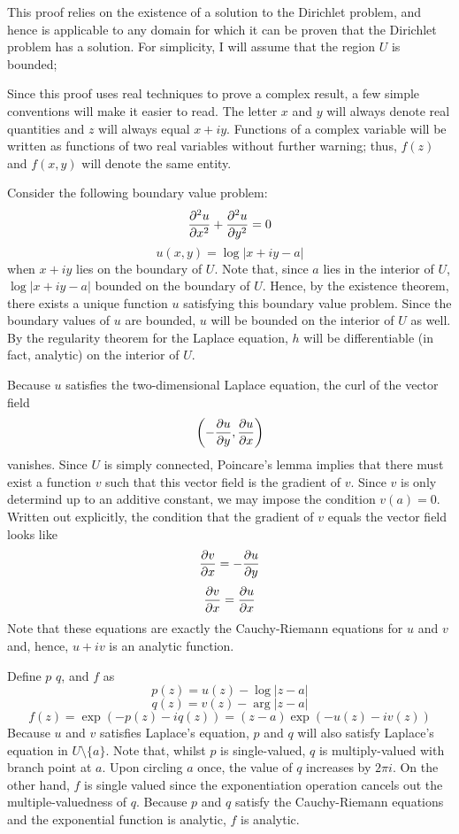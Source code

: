 \documentclass[12pt]{article}
\begin{document}
This proof relies on the existence of a solution to the Dirichlet problem, and hence is applicable to any domain for which it can be proven that the Dirichlet problem has a solution.  For simplicity, I will assume that the region $U$ is bounded; 

Since this proof uses real techniques to prove a complex result, a few simple conventions will make it easier to read.  The letter $x$ and $y$ will always denote real quantities and $z$ will always equal $x + i y$.  Functions of a complex variable will be written as functions of two real variables without further warning; thus, $f(z)$ and $f(x,y)$ will denote the same entity.

Consider the following boundary value problem:
 $${\partial^2 u \over \partial x^2} + {\partial^2 u \over \partial y^2} = 0$$
 $$u(x,y) = \log |x + i y - a|$$
when $x + iy$ lies on the boundary of $U$.  Note that, since $a$ lies in the interior of $U$, $\log |x + i y - a|$ bounded on the boundary of $U$.
Hence, by the existence theorem, there exists a unique function $u$ satisfying this boundary value problem.  Since the boundary values of $u$ are bounded, $u$ will be bounded on the interior of $U$ as well.  By the regularity theorem for the Laplace equation, $h$ will be differentiable (in fact, analytic) on the interior of $U$.

Because $u$ satisfies the two-dimensional Laplace equation, the curl of the vector field
 $$\left( -{\partial u \over \partial y}, {\partial u \over \partial x} \right)$$
vanishes.  Since $U$ is simply connected, Poincare's lemma implies that there must exist a function $v$ such that this vector field is the gradient of $v$.  Since $v$ is only determind up to an additive constant, we may impose the condition $v(a) = 0$.  Written out explicitly, the condition that the gradient of $v$ equals the vector field looks like
 $${\partial v \over \partial x} = -{\partial u \over \partial y}$$
 $${\partial v \over \partial x} = {\partial u \over \partial x}$$
Note that these equations are exactly the Cauchy-Riemann equations for $u$ and $v$ and, hence, $u + i v$ is an analytic function.

Define $p$ $q$, and $f$ as 
 $$p(z) = u(z) - \log |z - a|$$
 $$q(z) = v(z) - \arg |z - a|$$
 $$f(z) = \exp (-p(z) - iq(z)) = (z-a) \exp (- u(z) - iv(z) )$$
Because $u$ and $v$ satisfies Laplace's equation, $p$ and $q$ will also satisfy Laplace's equation in $U \setminus \{a\}$.  Note that, whilst $p$ is single-valued, $q$ is multiply-valued with branch point at $a$.  Upon circling $a$ once, the value of $q$ increases by $2 \pi i$.  On the other hand, $f$ is single valued since the exponentiation operation cancels out the multiple-valuedness of $q$.  Because $p$ and $q$ satisfy the Cauchy-Riemann equations and the exponential function is analytic, $f$ is analytic.
\end{document}
